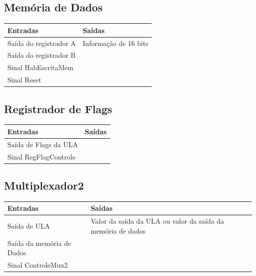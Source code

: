 \documentclass{article}
\begin{document}
 \subsection{Memória de Dados}
  \FloatBarrier
    \begin{table}[H]
      \begin{center}
        \begin{tabular}[pos]{|m{7cm} | m{7cm}|} 
          \hline
          \cellcolor[gray]{0.9}\textbf{Entradas} & \cellcolor[gray]{0.9}\textbf{Saídas} \\ \hline
            Saída do registrador A & Informação de 16 bits\\ \hline
            Saída do registrador B & \\ \hline
            Sinal HabEscritaMem & \\ \hline
            Sinal Reset & \\ \hline
        \end{tabular}
      \end{center}
    \end{table}  
    
 \subsection{Registrador de Flags}
  \FloatBarrier
    \begin{table}[H]
      \begin{center}
        \begin{tabular}[pos]{|m{7cm} | m{7cm}|} 
          \hline
          \cellcolor[gray]{0.9}\textbf{Entradas} & \cellcolor[gray]{0.9}\textbf{Saídas} \\ \hline
            Saída de Flags da ULA & \\ \hline
            Sinal RegFlagControle & \\ \hline
        \end{tabular}
      \end{center}
    \end{table}  
    
 \subsection{Multiplexador2}
  \FloatBarrier
    \begin{table}[H]
      \begin{center}
        \begin{tabular}[pos]{|m{7cm} | m{7cm}|} 
          \hline
          \cellcolor[gray]{0.9}\textbf{Entradas} & \cellcolor[gray]{0.9}\textbf{Saídas} \\ \hline
            Saída de ULA & Valor da saída da ULA ou valor da saída da memória de dados\\ \hline
            Saída da memória de Dados & \\ \hline
            Sinal ControleMux2 & \\ \hline
        \end{tabular}
      \end{center}
    \end{table}  
\newpage
\end{document}
